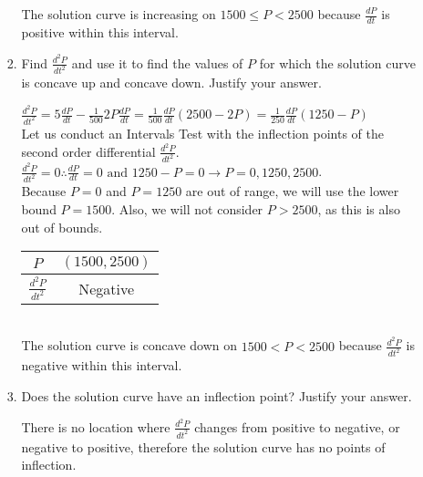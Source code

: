 \documentclass[10pt,letterpaper]{report}
\begin{document}
\begin{enumerate}
\begin{enumerate}
\begin{enumerate}
        The solution curve is increasing on $1500\leq P< 2500$ because $\frac{dP}{dt}$ is positive within this interval. \\
        
      \item{Find $\frac{d^{2}P}{dt^{2}}$ and use it to find the values of $P$ for which the solution curve is concave up and concave down. Justify your answer. \\}
      
        $\frac{d^{2}P}{dt^{2}}=5\frac{dP}{dt}-\frac{1}{500}2P\frac{dP}{dt}=\frac{1}{500}\frac{dP}{dt}\left(2500-2P\right)=\frac{1}{250}\frac{dP}{dt}\left(1250-P\right)$ \\
        
        Let us conduct an Intervals Test with the inflection points of the second order differential $\frac{d^{2}P}{dt^{2}}$. \\
        
        $\frac{d^{2}P}{dt^{2}}=0\therefore \frac{dP}{dt}=0 \text{ and } 1250-P=0\rightarrow P=0, 1250, 2500$. \\
        
        Because $P=0$ and $P=1250$ are out of range, we will use the lower bound $P=1500$. Also, we will not consider $P>2500$, as this is also out of bounds. 
        
        \begin{center}
          \begin{tabular}{| c | c |}
            \hline
            $P$ & $(1500, 2500)$ \\
            \hline
            $\frac{d^{2}P}{dt^{2}}$ & Negative \\
            \hline
          \end{tabular}
        \end{center} \\
        
        The solution curve is concave down on $1500<P<2500$ because $\frac{d^{2}P}{dt^{2}}$ is negative within this interval. \\
        
      \item{Does the solution curve have an inflection point? Justify your answer. \\}
      
        There is no location where $\frac{d^{2}P}{dt^{2}}$ changes from positive to negative, or negative to positive, therefore the solution curve has no points of inflection. \\
      

\end{enumerate}
\end{enumerate}
\end{enumerate}
\end{document}
